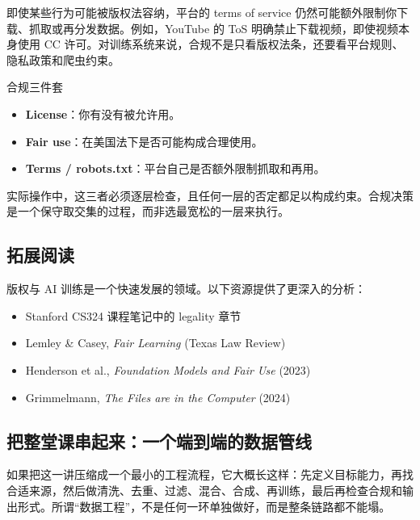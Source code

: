 即使某些行为可能被版权法容纳，平台的 terms of service 仍然可能额外限制你下载、抓取或再分发数据。例如，YouTube 的 ToS 明确禁止下载视频，即使视频本身使用 CC 许可。对训练系统来说，合规不是只看版权法条，还要看平台规则、隐私政策和爬虫约束。

\begin{knowledgebox}{合规三件套}
\begin{itemize}
    \item \textbf{License}：你有没有被允许用。
    \item \textbf{Fair use}：在美国法下是否可能构成合理使用。
    \item \textbf{Terms / robots.txt}：平台自己是否额外限制抓取和再用。
\end{itemize}
实际操作中，这三者必须逐层检查，且任何一层的否定都足以构成约束。合规决策是一个保守取交集的过程，而非选最宽松的一层来执行。
\end{knowledgebox}

\subsection{拓展阅读}

版权与 AI 训练是一个快速发展的领域。以下资源提供了更深入的分析：
\begin{itemize}
    \item Stanford CS324 课程笔记中的 legality 章节
    \item Lemley \& Casey, \textit{Fair Learning} (Texas Law Review)
    \item Henderson et al., \textit{Foundation Models and Fair Use} (2023)
    \item Grimmelmann, \textit{The Files are in the Computer} (2024)
\end{itemize}

\subsection{把整堂课串起来：一个端到端的数据管线}

如果把这一讲压缩成一个最小的工程流程，它大概长这样：先定义目标能力，再找合适来源，然后做清洗、去重、过滤、混合、合成、再训练，最后再检查合规和输出形式。所谓“数据工程”，不是任何一环单独做好，而是整条链路都不能塌。

